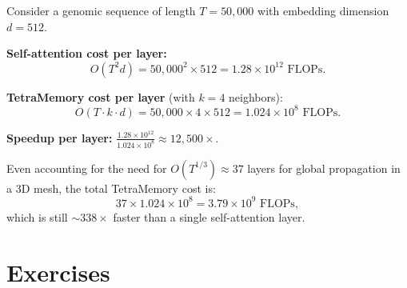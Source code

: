 \begin{example}
\label{ex:cost-comparison}
Consider a genomic sequence of length $T = 50{,}000$ with embedding dimension
$d = 512$.

\textbf{Self-attention cost per layer:}
\[
  O(T^2 d) = 50{,}000^2 \times 512 = 1.28 \times 10^{12} \text{ FLOPs}.
\]

\textbf{TetraMemory cost per layer} (with $k = 4$ neighbors):
\[
  O(T \cdot k \cdot d) = 50{,}000 \times 4 \times 512 = 1.024 \times 10^{8} \text{ FLOPs}.
\]

\textbf{Speedup per layer:} $\frac{1.28 \times 10^{12}}{1.024 \times 10^{8}} \approx 12{,}500\times$.

Even accounting for the need for $O(T^{1/3}) \approx 37$ layers for global
propagation in a 3D mesh, the total TetraMemory cost is:
\[
  37 \times 1.024 \times 10^{8} = 3.79 \times 10^{9} \text{ FLOPs},
\]
which is still $\sim$$338\times$ faster than a single self-attention layer.
\end{example}

\section{Exercises}
\label{sec:ch10-exercises}

